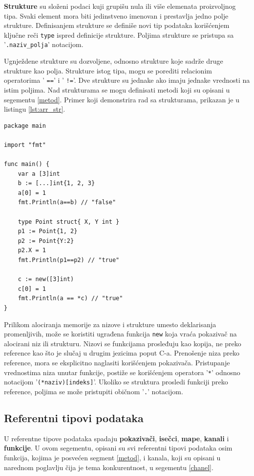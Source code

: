 \documentclass[12pt,oneside]{memoir}
\begin{document}
\textbf{Strukture} su složeni podaci kuji grupišu nula ili više elemenata proizvoljnog tipa. Svaki element mora biti jedinstveno imenovan i prestavlja jedno polje strukture. Definisanjem strukture se definiše novi tip podataka korišćenjem ključne reči \texttt{type} ispred definicije strukture. Poljima strukture se pristupa sa '\texttt{.naziv\_polja}' notacijom. 

Ugnježdene strukture su dozvoljene, odnosno strukture koje sadrže druge strukture kao polja. Strukture istog tipa, mogu se porediti relacionim operatorima  ' \texttt{==}' i ' \texttt{!=}'. Dve strukture su jednake ako imaju jednake vrednosti na istim poljima. Nad strukturama se mogu definisati metodi koji su opisani u segementu \ref{metod}. Primer koji demonstrira rad sa strukturama, prikazan je u listingu  \ref{lst:arr_str}.

\begin{center}
\begin{lstlisting}[caption=Primer koji demonstrira rad sa nizovima i strukturama, label={lst:arr_str},  backgroundcolor=\color{background}]
package main

import "fmt"

func main() {
	var a [3]int
	b := [...]int{1, 2, 3}
	a[0] = 1
	fmt.Println(a==b) // "false"

	type Point struct{ X, Y int }
	p1 := Point{1, 2}
	p2 := Point{Y:2}
	p2.X = 1
	fmt.Println(p1==p2) // "true"

	c := new([3]int)
	c[0] = 1
	fmt.Println(a == *c) // "true"			
}
\end{lstlisting}
\end{center}

Prilikom alociranja memorije za nizove i strukture umesto deklarisanja promenljivih, može se koristiti ugrađena funkcija \texttt{new} koja vraća pokazivač na alocirani niz ili strukturu. Nizovi se funkcijama prosleđuju kao kopija, ne preko reference kao što je slučaj u drugim jezicima poput C-a. Prenošenje niza preko reference, mora se eksplicitno naglasiti korišćenjem pokazivača. Pristupanje vrednostima niza unutar funkcije, postiže se korišćenjem operatora '\texttt{*}' odnosno notacijom '\texttt{(*naziv)[indeks]}'. Ukoliko se struktura prosledi funkciji preko reference, poljima se može pristupiti običnom '\texttt{.}' notacijom.

\subsection{Referentni tipovi podataka}
U referentne tipove podataka spadaju \textbf{pokazivači}, \textbf{isečci}, \textbf{mape}, \textbf{kanali} i \textbf{funkcije}. U ovom segementu, opisani su svi referentni tipovi podataka osim funkcija, kojima je posvećen segment \ref{metod}, i kanala, koji su opisani u narednom poglavlju čija je tema konkurentnost, u segementu \ref{chanel}. 
\\
\end{document}
